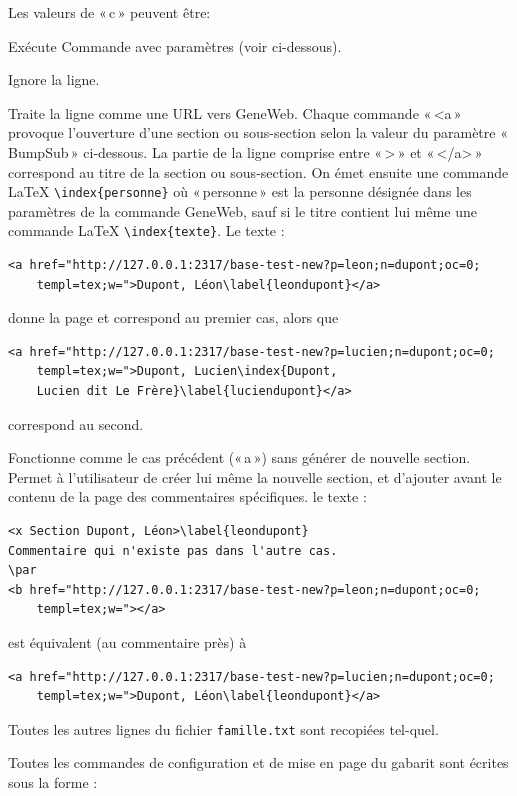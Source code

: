 Les valeurs de «\,c\,» peuvent être:
\begin{description}[style=nextline]
\item[x] Exécute Commande avec paramètres (voir ci-dessous).
\item[y] Ignore la ligne.
\item[a] Traite la ligne comme une URL vers GeneWeb.
Chaque commande «\,<a\,» provoque l'ouverture d'une section ou sous-section selon
la valeur du paramètre «\,BumpSub\,» ci-dessous. La partie de la ligne comprise entre
«\,>\,» et «\,</a>\,» correspond au titre de la section ou sous-section.
On émet ensuite une commande \LaTeX{} \verb|\index{personne}| où «\,personne\,» est
la personne désignée dans les paramètres de la commande GeneWeb, sauf si le
titre contient lui même une commande \LaTeX{} \verb|\index{texte}|.
Le texte :
\begin{verbatim}
<a href="http://127.0.0.1:2317/base-test-new?p=leon;n=dupont;oc=0;
    templ=tex;w=">Dupont, Léon\label{leondupont}</a>
\end{verbatim}
donne la page \pageref{leondupont} et correspond au premier cas, alors que
\begin{verbatim}
<a href="http://127.0.0.1:2317/base-test-new?p=lucien;n=dupont;oc=0;
    templ=tex;w=">Dupont, Lucien\index{Dupont,
    Lucien dit Le Frère}\label{luciendupont}</a>
\end{verbatim}
correspond au second.
\item[b] Fonctionne comme le cas précédent («\,a\,») sans générer de
nouvelle section. Permet à l'utilisateur de créer lui même la nouvelle
section, et d'ajouter avant le contenu de la page des commentaires spécifiques.
le texte :
\begin{verbatim}
<x Section Dupont, Léon>\label{leondupont}
Commentaire qui n'existe pas dans l'autre cas.
\par
<b href="http://127.0.0.1:2317/base-test-new?p=leon;n=dupont;oc=0;
    templ=tex;w="></a>
\end{verbatim}
est équivalent (au commentaire près) à
\begin{verbatim}
<a href="http://127.0.0.1:2317/base-test-new?p=lucien;n=dupont;oc=0;
    templ=tex;w=">Dupont, Léon\label{leondupont}</a>
\end{verbatim}
\end{description}
Toutes les autres lignes du fichier \verb|famille.txt| sont recopiées tel-quel.

\par
Toutes les commandes de configuration et de mise en page du gabarit sont
écrites sous la forme :

